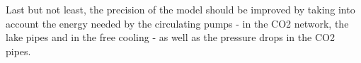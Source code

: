 \documentclass{article}
\begin{document}
Last but not least, the precision of the model should be improved by taking into account the energy needed by the circulating pumps - in the CO2 network, the lake pipes and in the free cooling - as well as the pressure drops in the CO2 pipes.
 

\clearpage


\clearpage
\appendix	



\end{document}

